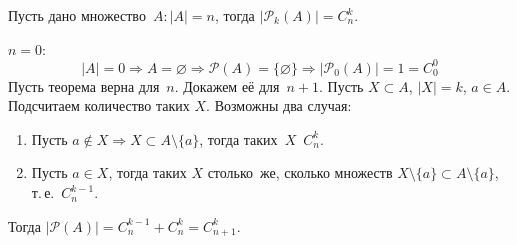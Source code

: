 \begin{theorem}
	Пусть дано множество~$A \colon |A| = n$, тогда $|\mathcal P_k(A)| = C_n^k$.
\end{theorem}
\begin{proofmathind}
	\indbase $n = 0$:
	\[ |A| = 0 \Rightarrow A = \varnothing \Rightarrow \mathcal P(A) = \{ \varnothing \} \Rightarrow |\mathcal P_0(A)| = 1 = C_0^0 \]
	\indstep Пусть теорема верна для~$n$.
	Докажем её для~$n + 1$.
	Пусть $X \subset A$, $|X| = k$, $a \in A$.
	Подсчитаем количество таких $X$.
	Возможны два случая:
\begin{enumerate}
	\item Пусть $a \notin X \Rightarrow X \subset A \setminus \{ a \}$, тогда таких~$X$~$C_n^k$.
	\item Пусть $a \in X$, тогда таких $X$ столько~же, сколько множеств
	$X \setminus \{ a \} \subset A \setminus \{ a \}$, т.\,е.~$C_n^{k-1}$.
\end{enumerate}

	Тогда $|\mathcal P(A)| = C_n^{k-1} + C_n^k = C_{n+1}^k$.
	\indend
	
\end{proofmathind}